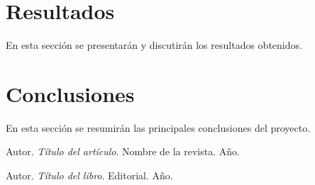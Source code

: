 \documentclass[12pt]{article}
\begin{document}


    \section{Resultados}
    En esta sección se presentarán y discutirán los resultados obtenidos.



    \section{Conclusiones}
    En esta sección se resumirán las principales conclusiones del proyecto.

    \begin{thebibliography}{9}
        Autor. \textit{Título del artículo}. Nombre de la revista. Año.

        Autor. \textit{Título del libro}. Editorial. Año.
    \end{thebibliography}
\end{document}
